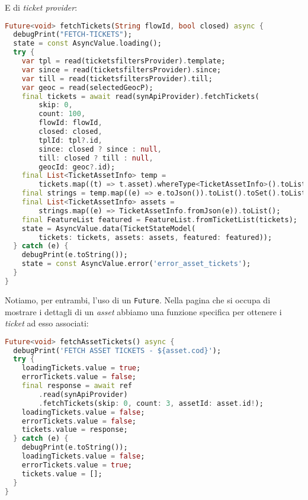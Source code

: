 E di \textit{ticket provider}:

\begin{lstlisting}[language=dart, label={lst:mobilesyn_ticket_provider}, firstnumber=1,caption={mobilesyn \textit{ticket provider}}]
Future<void> fetchTickets(String flowId, bool closed) async {
  debugPrint("FETCH-TICKETS");
  state = const AsyncValue.loading();
  try {
    var tpl = read(ticketsfiltersProvider).template;
    var since = read(ticketsfiltersProvider).since;
    var till = read(ticketsfiltersProvider).till;
    var geoc = read(selectedGeocP);
    final tickets = await read(synApiProvider).fetchTickets(
        skip: 0,
        count: 100,
        flowId: flowId,
        closed: closed,
        tplId: tpl?.id,
        since: closed ? since : null,
        till: closed ? till : null,
        geocId: geoc?.id);
    final List<TicketAssetInfo> temp =
        tickets.map((t) => t.asset).whereType<TicketAssetInfo>().toList();
    final strings = temp.map((e) => e.toJson()).toList().toSet().toList();
    final List<TicketAssetInfo> assets =
        strings.map((e) => TicketAssetInfo.fromJson(e)).toList();
    final FeatureList featured = FeatureList.fromTicketList(tickets);
    state = AsyncValue.data(TicketStateModel(
        tickets: tickets, assets: assets, featured: featured));
  } catch (e) {
    debugPrint(e.toString());
    state = const AsyncValue.error('error_asset_tickets');
  }
}
\end{lstlisting} 

Notiamo, per entrambi, l'uso di un \verb+Future+. Nella pagina che si occupa di mostrare i dettagli di un \textit{asset} abbiamo una funzione specifica per ottenere i \textit{ticket} ad esso associati:

\begin{lstlisting}[language=dart, label={lst:mobilesyn_asset_ticket_provider}, firstnumber=1,caption={mobilesyn \textit{asset ticket provider}}]
Future<void> fetchAssetTickets() async {
  debugPrint('FETCH ASSET TICKETS - ${asset.cod}');
  try {
    loadingTickets.value = true;
    errorTickets.value = false;
    final response = await ref
        .read(synApiProvider)
        .fetchTickets(skip: 0, count: 3, assetId: asset.id!);
    loadingTickets.value = false;
    errorTickets.value = false;
    tickets.value = response;
  } catch (e) {
    debugPrint(e.toString());
    loadingTickets.value = false;
    errorTickets.value = true;
    tickets.value = [];
  }
}
\end{lstlisting} 



